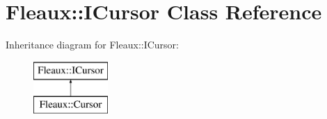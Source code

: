 \hypertarget{classFleaux_1_1ICursor}{}\section{Fleaux\+:\+:I\+Cursor Class Reference}
\label{classFleaux_1_1ICursor}
Inheritance diagram for Fleaux\+:\+:I\+Cursor\+:\begin{figure}[H]
\begin{center}
\leavevmode
\includegraphics[height=2.000000cm]{classFleaux_1_1ICursor}
\end{center}
\end{figure}
